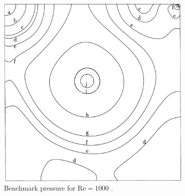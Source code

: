 \begin{figure}[p]
    \centering
    \includegraphics[width=0.85\textwidth]{Images/pressure.png}
    \caption{Benchmark pressure for $\text{Re} = 1000$ \parencite{botella1998benchmark}.}
    \label{fig:benchmarkPN64}
\end{figure}

